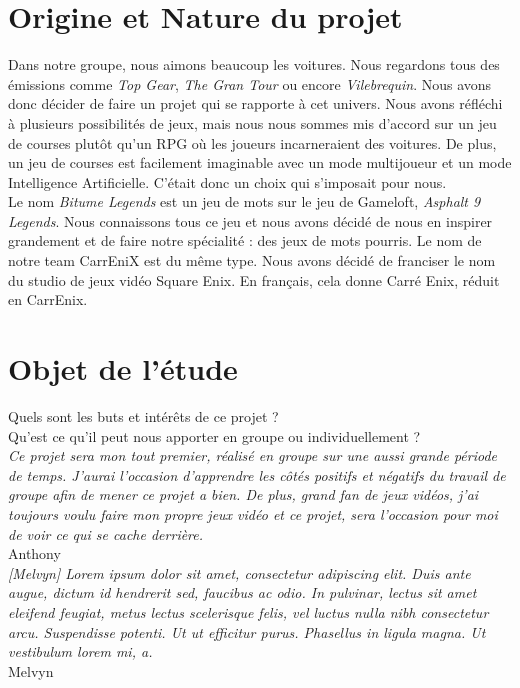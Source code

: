 \documentclass[11pt,a4paper]{article}
\begin{document}
\clearpage

\section{Origine et Nature du projet}
  Dans notre groupe, nous aimons beaucoup les voitures. Nous regardons tous des émissions comme 
  \textit{Top Gear}, \textit{The Gran Tour} ou encore \textit{Vilebrequin}. Nous avons donc décider de faire
  un projet qui se rapporte à cet univers. Nous avons réfléchi à plusieurs possibilités de jeux, mais nous
  nous sommes mis d'accord sur un jeu de courses plutôt qu'un RPG où les joueurs incarneraient des voitures.
  De plus, un jeu de courses est facilement imaginable avec un mode multijoueur et un mode Intelligence 
  Artificielle. C'était donc un choix qui s'imposait pour nous.\\
  \indent Le nom \textit{Bitume Legends} est un jeu de mots sur le jeu de Gameloft, \textit{Asphalt 9 Legends}.
  Nous connaissons tous ce jeu et nous avons décidé de nous en inspirer grandement et de faire notre 
  spécialité : des jeux de mots pourris. Le nom de notre team CarrEniX est du même type. Nous avons décidé
  de franciser le nom du studio de jeux vidéo Square Enix. En français, cela donne Carré Enix, réduit en
  CarrEnix.
\clearpage

\section{Objet de l'étude}
  Quels sont les buts et intérêts de ce projet ?\\

  Qu'est ce qu'il peut nous apporter en groupe ou individuellement ?\\

  \textit{Ce projet sera mon tout premier, réalisé en groupe sur une aussi grande période de temps. J'aurai l'occasion d'apprendre les côtés positifs et négatifs du travail de groupe afin de mener ce projet a bien. De plus, grand fan de jeux vidéos, j'ai toujours voulu faire mon propre jeux vidéo et ce projet, sera l'occasion pour moi de voir ce qui se cache derrière.}\\\indent Anthony\\

  \textit{[Melvyn] Lorem ipsum dolor sit amet, consectetur adipiscing elit. Duis ante augue, dictum id hendrerit sed, faucibus ac odio. In pulvinar, lectus sit amet eleifend feugiat, metus lectus scelerisque felis, vel luctus nulla nibh consectetur arcu. Suspendisse potenti. Ut ut efficitur purus. Phasellus in ligula magna. Ut vestibulum lorem mi, a.}\\
  \indent Melvyn\\
\end{document}
